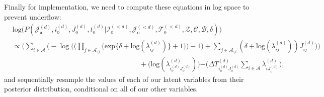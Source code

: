 \documentclass[a4paper]{article}
\begin{document}
Finally for implementation, we need to compute these equations in log space to prevent underflow:
 \begin{equation}
 \begin{aligned}
 &\mbox{log}\Big(P(\mathcal{J}^{(d)}_{\mbox{a}}, i^{(d)}_{\mbox{o}}, J^{(d)}_{\mbox{o}}, t^{(d)}_{\mbox{o}} |\mathcal{I}^{(<d)}_{\mbox{o}}, \mathcal{J}^{(<d)}_{\mbox{o}}, \mathcal{T}^{(<d)}_{\mbox{o}}, \mathcal{Z}, \mathcal{C}, \mathcal{B},  \delta)\Big)\\&\propto \Big(\sum_{i\in \mathcal{A}}\Big(-\log\Big(\Big(\prod_{j \in \mathcal{A}_{\backslash i}} \Big(\mbox{exp}\{\delta+\mbox{log}(\lambda_{ij}^{(d)})\} + 1\Big)\Big)-1\Big) + \sum_{j \in \mathcal{A}_{\backslash i}} (\delta+\mbox{log}(\lambda_{ij}^{(d)}))J_{ij}^{(d)}\Big)\Big)\\&\quad\quad\quad\quad\quad\quad\quad\quad\quad\quad\quad\quad\quad\quad\quad\quad\quad\quad +  \Big(\mbox{log}(\lambda^{(d)}_{i_o^{(d)}J_o^{(d)}})\Big){ - \Big(\Delta T^{(d)}_{i_o^{(d)}J_o^{(d)}}\sum\limits_{i \in \mathcal{A}}\lambda^{(d)}_{i{J_i^{(d)}}}}\Big),
 \end{aligned}
 \end{equation}
 and sequentially resample the values of each of our latent variables from their posterior distribution, conditional on all of our other variables.
\end{document}
